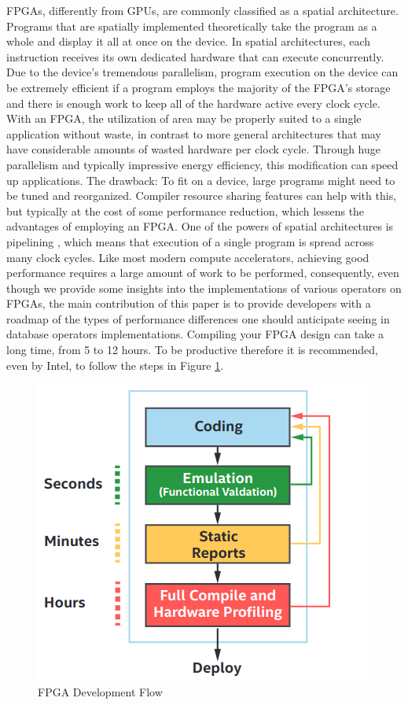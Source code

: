 \documentclass[sigconf, nonacm]{acmart}
\begin{document}
FPGAs, differently from GPUs, are commonly classified as a spatial architecture.
Programs that are spatially implemented theoretically take the program as a whole and display it all at once on the device.
In spatial architectures, each instruction receives its own dedicated hardware that can execute concurrently.
Due to the device's tremendous parallelism, program execution on the device can be extremely efficient if a program employs the majority of the FPGA's storage and there is enough work to keep all of the hardware active every clock cycle.
With an FPGA, the utilization of area may be properly suited to a single application without waste, in contrast to more general architectures that may have considerable amounts of wasted hardware per clock cycle.
Through huge parallelism and typically impressive energy efficiency, this modification can speed up applications. 
The drawback: To fit on a device, large programs might need to be tuned and reorganized.
Compiler resource sharing features can help with this, but typically at the cost of some performance reduction, which lessens the advantages of employing an FPGA.
One of the powers of spatial architectures is pipelining \cite{dpcpp_book}, which means that
execution of a single program is spread across many clock cycles.
Like most modern compute accelerators, achieving good performance
requires a large amount of work to be performed, consequently, even though we provide some insights into the implementations of various operators on FPGAs, the main contribution of this paper is to provide developers with a roadmap of the types of performance differences one should anticipate seeing in database operators implementations.
Compiling your FPGA design can take a long time, from 5 to 12 hours. To be productive therefore it is recommended, even by Intel\cite{fpga_optim}, to follow the steps in Figure \ref{fig:dev}.
\begin{figure}[H]
  \centering
  \includegraphics[width=\linewidth]{figures/development-fpga.png}
  \caption{FPGA Development Flow}
    \label{fig:dev}
\end{figure}
\end{document}
